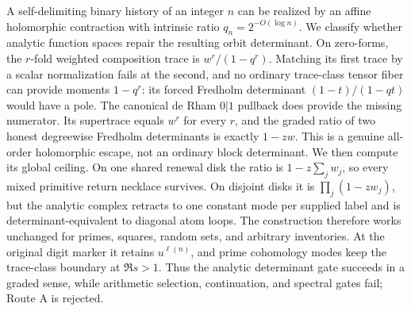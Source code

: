 A self-delimiting binary history of an integer $n$ can be realized by an
affine holomorphic contraction with intrinsic ratio
$q_n=2^{-O(\log n)}$.  We classify whether analytic function spaces repair
the resulting orbit determinant.  On zero-forms, the $r$-fold weighted
composition trace is $w^r/(1-q^r)$.  Matching its first trace by a scalar
normalization fails at the second, and no ordinary trace-class tensor fiber
can provide moments $1-q^r$: its forced Fredholm determinant
$(1-t)/(1-qt)$ would have a pole.  The canonical de Rham $0|1$ pullback
does provide the missing numerator.  Its supertrace equals $w^r$ for every
$r$, and the graded ratio of two honest degreewise Fredholm determinants is
exactly $1-zw$.  This is a genuine all-order holomorphic escape, not an
ordinary block determinant.  We then compute its global ceiling.  On one
shared renewal disk the ratio is $1-z\sum_jw_j$, so every mixed primitive
return necklace survives.  On disjoint disks it is
$\prod_j(1-zw_j)$, but the analytic complex retracts to one constant mode
per supplied label and is determinant-equivalent to diagonal atom loops.
The construction therefore works unchanged for primes, squares, random
sets, and arbitrary inventories.  At the original digit marker it retains
$u^{\ell(n)}$, and prime cohomology modes keep the trace-class boundary at
$\Re s>1$.  Thus the analytic determinant gate succeeds in a graded sense,
while arithmetic selection, continuation, and spectral gates fail; Route A
is rejected.
